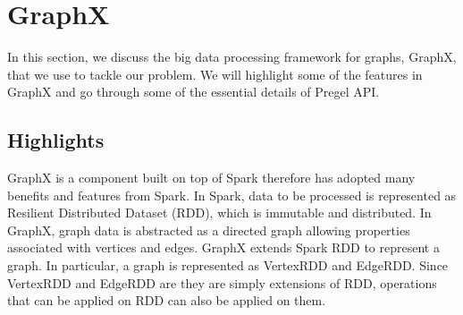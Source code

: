 \section{GraphX} \label{sec:framework}
%
In this section, we discuss the big data processing framework for graphs, GraphX, that we use to tackle our problem.
%
We will highlight some of the features in GraphX and go through some of the essential details of Pregel API.
%
\subsection{Highlights}
%
GraphX is a component built on top of Spark therefore has adopted many benefits and features from Spark.
%
In Spark, data to be processed is represented as Resilient Distributed Dataset (RDD), which is immutable and distributed.
%
In GraphX, graph data is abstracted as a directed graph allowing properties associated with vertices and edges.
%
GraphX extends Spark RDD to represent a graph.
%
In particular, a graph is represented as VertexRDD and EdgeRDD.
%
Since VertexRDD and EdgeRDD are they are simply extensions of RDD, operations that can be applied on RDD can also be applied on them.
%
